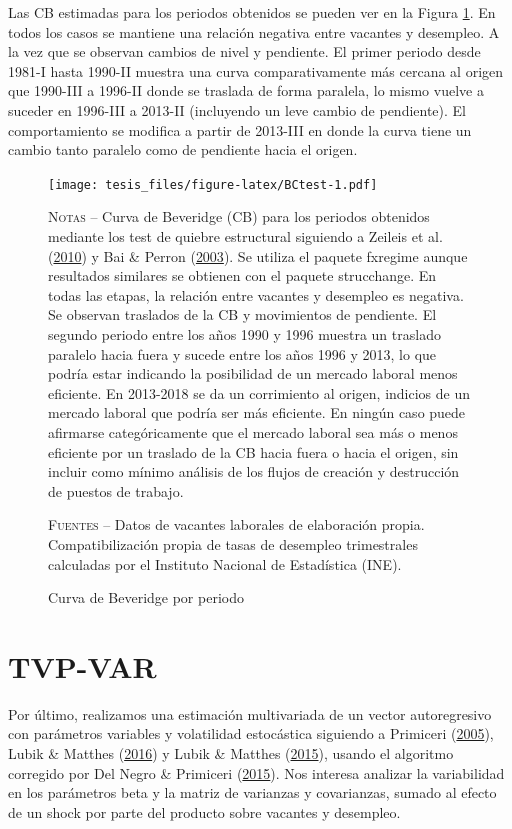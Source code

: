 \documentclass[12pt,oneside]{reedthesis}
\begin{document}
Las CB estimadas para los periodos obtenidos se pueden ver en la Figura \ref{fig:BCtest}. En todos los casos se mantiene una relación negativa entre vacantes y desempleo. A la vez que se observan cambios de nivel y pendiente. El primer periodo desde 1981-I hasta 1990-II muestra una curva comparativamente más cercana al origen que 1990-III a 1996-II donde se traslada de forma paralela, lo mismo vuelve a suceder en 1996-III a 2013-II (incluyendo un leve cambio de pendiente). El comportamiento se modifica a partir de 2013-III en donde la curva tiene un cambio tanto paralelo como de pendiente hacia el origen.
\begin{figure}
\texttt{[image: tesis\_files/figure-latex/BCtest-1.pdf]}
\caption{Curva de Beveridge por periodo}\label{fig:BCtest}\textsc{}

\footnotesize\textsc{Notas} -- Curva de Beveridge (CB) para los periodos obtenidos mediante los test de quiebre estructural siguiendo a Zeileis et al. (\protect\hyperlink{ref-Zeileis2010}{2010}) y Bai \& Perron (\protect\hyperlink{ref-BaiPerron2003}{2003}). Se utiliza el paquete fxregime aunque resultados similares se obtienen con el paquete strucchange. En todas las etapas, la relación entre vacantes y desempleo es negativa. Se observan traslados de la CB y movimientos de pendiente. El segundo periodo entre los años 1990 y 1996 muestra un traslado paralelo hacia fuera y sucede entre los años 1996 y 2013, lo que podría estar indicando la posibilidad de un mercado laboral menos eficiente. En 2013-2018 se da un corrimiento al origen, indicios de un mercado laboral que podría ser más eficiente. En ningún caso puede afirmarse categóricamente que el mercado laboral sea más o menos eficiente por un traslado de la CB hacia fuera o hacia el origen, sin incluir como mínimo análisis de los flujos de creación y destrucción de puestos de trabajo.

\textsc{Fuentes} -- Datos de vacantes laborales de elaboración propia. Compatibilización propia de tasas de desempleo trimestrales calculadas por el Instituto Nacional de Estadística (INE).
\end{figure}
\hypertarget{tvp-var-1}{%
\section{TVP-VAR}\label{tvp-var-1}}

Por último, realizamos una estimación multivariada de un vector autoregresivo con parámetros variables y volatilidad estocástica siguiendo a Primiceri (\protect\hyperlink{ref-Primiceri2005}{2005}), Lubik \& Matthes (\protect\hyperlink{ref-Lubik2016}{2016}) y Lubik \& Matthes (\protect\hyperlink{ref-Lubik2016b}{2015}), usando el algoritmo corregido por Del Negro \& Primiceri (\protect\hyperlink{ref-DelNegro2015}{2015}). Nos interesa analizar la variabilidad en los parámetros beta y la matriz de varianzas y covarianzas, sumado al efecto de un shock por parte del producto sobre vacantes y desempleo.
\end{document}
